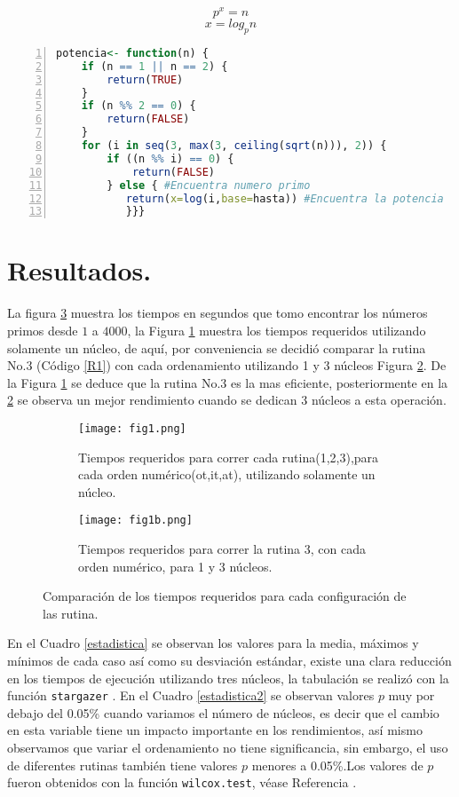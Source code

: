 \documentclass{article}
\begin{document}
\begin{equation}
    p^x=n
\end{equation}
\begin{equation}
    x=log_pn
\end{equation}
 \begin{lstlisting}[frame=single,numbers=left,language=R,caption=Función para encontrar el valor de la potencia $x$. \label{R2}]
potencia<- function(n) {
    if (n == 1 || n == 2) {
        return(TRUE)
    }
    if (n %% 2 == 0) {
        return(FALSE)
    }
    for (i in seq(3, max(3, ceiling(sqrt(n))), 2)) {
        if ((n %% i) == 0) {
            return(FALSE)
        } else { #Encuentra numero primo
           return(x=log(i,base=hasta)) #Encuentra la potencia
           }}}
\end{lstlisting} 
\section{Resultados.}
La figura \ref{F1} muestra los  tiempos en segundos que tomo encontrar los números primos desde $1$ a $4000$, la Figura \ref{fig1} muestra los tiempos requeridos utilizando solamente un núcleo, de aquí, por conveniencia se decidió comparar la rutina No.3 (Código \ref{R1}) con cada ordenamiento utilizando 1 y 3 núcleos Figura \ref{fig1b}. De la Figura \ref{fig1} se deduce que la rutina No.3 es la mas eficiente, posteriormente en la \ref{fig1b} se observa un mejor rendimiento cuando se dedican 3 núcleos a esta operación. 

\begin{figure}
     \centering
     \begin{subfigure}[b]{.8\textwidth}
         \centering
         \texttt{[image: fig1.png]}
         \caption{Tiempos requeridos para correr cada rutina(1,2,3),para cada orden numérico(ot,it,at), utilizando solamente un núcleo.}
         \label{fig1}
     \end{subfigure}
     \hfill
     \begin{subfigure}[b]{.8\textwidth}
         \centering
         \texttt{[image: fig1b.png]}
         \caption{Tiempos requeridos para correr la rutina 3, con cada orden numérico, para 1 y 3 núcleos.}
         \label{fig1b}
     \end{subfigure}
     \caption{Comparación de los tiempos requeridos para cada configuración de las rutina.}
        \label{F1}
\end{figure}
En el Cuadro \ref{estadistica} se observan los valores para la media, máximos y mínimos de cada caso así como su desviación estándar, existe una clara reducción en los tiempos de ejecución utilizando tres núcleos, la tabulación se realizó con la función \texttt{stargazer} \citep{stargazer}. En el Cuadro \ref{estadistica2} se observan valores $p$ muy por debajo del 0.05\% cuando variamos el número de núcleos, es decir que el cambio en esta variable tiene un impacto importante en los rendimientos, así mismo observamos que variar el ordenamiento no tiene significancia, sin embargo, el uso de diferentes rutinas también tiene valores $p$ menores a 0.05\%.Los valores de $p$ fueron obtenidos con la función \texttt{wilcox.test}, véase Referencia \citep{DATA.ANALYTICS}.
\end{document}
